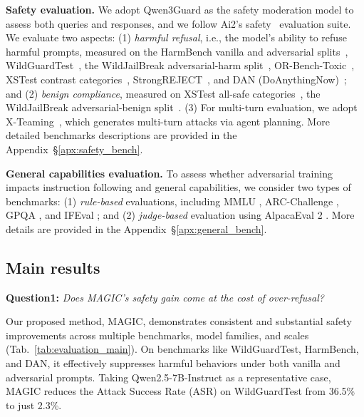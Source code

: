 \documentclass[11pt, letterpaper]{template}
\theoremstyle{plain}
\theoremstyle{definition}
\theoremstyle{remark}
\begin{document}
\textbf{Safety evaluation.} We adopt Qwen3Guard as the safety moderation model to assess both queries and responses, and we follow Ai2's safety~\citep{han2024wildguard,jiang2024wildteaming} evaluation suite. We evaluate two aspects: (1) \textit{harmful refusal}, i.e., the model's ability to refuse harmful prompts, measured on the HarmBench vanilla and adversarial splits~\citep{mazeika2024harmbench}, WildGuardTest~\citep{han2024wildguard}, the WildJailBreak adversarial-harm split~\citep{jiang2024wildteaming}, OR-Bench-Toxic~\citep{cui2024orbench}, XSTest contrast categories~\citep{rottger2023xstest}, StrongREJECT~\citep{souly2024strongreject}, and DAN (DoAnythingNow)~\citep{shen2023doanythingnow}; and (2) \textit{benign compliance}, measured on XSTest all-safe categories~\citep{rottger2023xstest}, the WildJailBreak adversarial-benign split~\citep{jiang2024wildteaming}. (3) For multi-turn evaluation, we adopt X-Teaming~\citep{rahman2025xteaming}, which generates multi-turn attacks via agent planning. More detailed benchmarks descriptions are provided in the Appendix~\S\ref{apx:safety_bench}.

\textbf{General capabilities evaluation.} To assess whether adversarial training impacts instruction following and general capabilities, we consider two types of benchmarks: (1) \textit{rule-based} evaluations, including MMLU \citep{hendrycks2021mmlu}, ARC-Challenge \citep{clark2018arc}, GPQA \citep{rein2023gpqa}, and IFEval \citep{zhou2023ifeval}; and (2) \textit{judge-based} evaluation using AlpacaEval 2 \citep{dubois2024alpacaeval2}. 
More details are provided in the Appendix~\S\ref{apx:general_bench}.


\subsection{Main results}
\begin{rqbox}
\textbf{Question1:} \textit{Does MAGIC’s safety gain come at the cost of over-refusal?}
\end{rqbox}

Our proposed method, MAGIC, demonstrates consistent and substantial safety improvements across multiple benchmarks, model families, and scales (Tab.~\ref{tab:evaluation_main}). On benchmarks like WildGuardTest, HarmBench, and DAN, it effectively suppresses harmful behaviors under both vanilla and adversarial prompts. Taking Qwen2.5-7B-Instruct as a representative case, MAGIC reduces the Attack Success Rate (ASR) on WildGuardTest from 36.5\% to just 2.3\%. 
\end{document}
